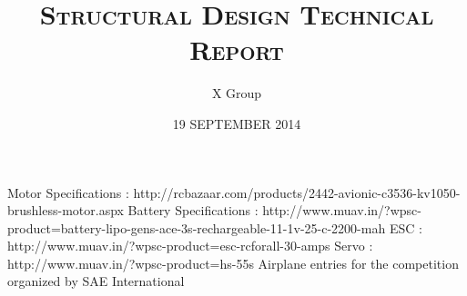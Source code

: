 \documentclass{iitm_course_report}
\begin{document}
\title{\textsc{\MakeUppercase Structural Design Technical Report}}
\author{X Group}
\date{19 SEPTEMBER 2014}
\maketitle
\cleardoublepage
%

\cleardoublepage
%

\cleardoublepage
\begin{singlespace}
\tableofcontents
\thispagestyle{empty}
\cleardoublepage
\listoftables
{}
\cleardoublepage
\listoffigures
{}
\end{singlespace}
\cleardoublepage

\cleardoublepage
\footskip=0.2in

\cleardoublepage

\cleardoublepage
%
\begin{singlespace}


\end{singlespace}
\begin{thebibliography}{10}

   Motor Specifications : http://rcbazaar.com/products/2442-avionic-c3536-kv1050-brushless-motor.aspx
   Battery Specifications : http://www.muav.in/?wpsc-product=battery-lipo-gens-ace-3s-rechargeable-11-1v-25-c-2200-mah
   ESC : http://www.muav.in/?wpsc-product=esc-rcforall-30-amps
   Servo : http://www.muav.in/?wpsc-product=hs-55s
   Airplane entries for the competition organized by SAE International

\end{thebibliography}
  \renewcommand{\theequation}{A-\arabic{equation}}
  \renewcommand{\thesection}{A.\arabic{section}}
  \renewcommand{\thetable}{A.\arabic{table}}
  \renewcommand{\thefigure}{A.\arabic{figure}}
  \setcounter{equation}{0}  %
%
\end{document}
